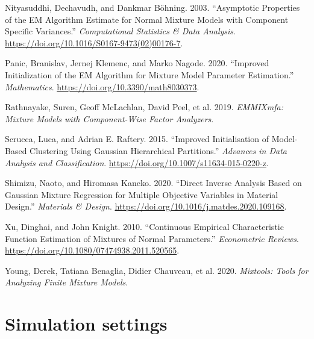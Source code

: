 \begin{CSLReferences}{1}{0}
\leavevmode{}%
Nityasuddhi, Dechavudh, and Dankmar Böhning. 2003. {``Asymptotic Properties of the {EM} Algorithm Estimate for Normal Mixture Models with Component Specific Variances.''} \emph{Computational Statistics \& Data Analysis}. \url{https://doi.org/10.1016/S0167-9473(02)00176-7}.

\leavevmode{}%
Panic, Branislav, Jernej Klemenc, and Marko Nagode. 2020. {``Improved Initialization of the EM Algorithm for Mixture Model Parameter Estimation.''} \emph{Mathematics}. \url{https://doi.org/10.3390/math8030373}.

\leavevmode{}%
Rathnayake, Suren, Geoff McLachlan, David Peel, et al. 2019. \emph{EMMIXmfa: Mixture Models with Component-Wise Factor Analyzers}.

\leavevmode{}%
Scrucca, Luca, and Adrian E. Raftery. 2015. {``Improved Initialisation of Model-Based Clustering Using {Gaussian} Hierarchical Partitions.''} \emph{Advances in Data Analysis and Classification}. \url{https://doi.org/10.1007/s11634-015-0220-z}.

\leavevmode{}%
Shimizu, Naoto, and Hiromasa Kaneko. 2020. {``Direct Inverse Analysis Based on {Gaussian} Mixture Regression for Multiple Objective Variables in Material Design.''} \emph{Materials \& Design}. \url{https://doi.org/10.1016/j.matdes.2020.109168}.

\leavevmode{}%
Xu, Dinghai, and John Knight. 2010. {``Continuous {Empirical Characteristic Function Estimation} of {Mixtures} of {Normal Parameters}.''} \emph{Econometric Reviews}. \url{https://doi.org/10.1080/07474938.2011.520565}.

\leavevmode{}%
Young, Derek, Tatiana Benaglia, Didier Chauveau, et al. 2020. \emph{Mixtools: Tools for Analyzing Finite Mixture Models}.

\end{CSLReferences}

\newpage

\hypertarget{simulation-settings}{%
\section{Simulation settings}\label{simulation-settings}}

